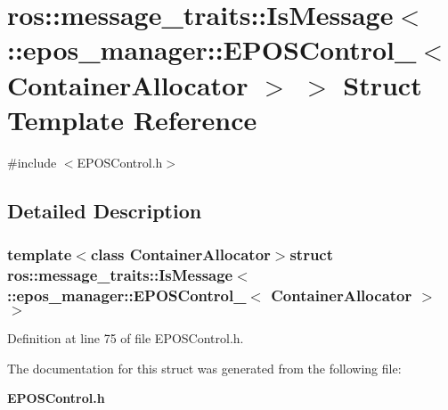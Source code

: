 \section{ros\-:\-:message\-\_\-traits\-:\-:\-Is\-Message$<$ \-:\-:epos\-\_\-manager\-:\-:\-E\-P\-O\-S\-Control\-\_\-$<$ \-Container\-Allocator $>$ $>$ \-Struct \-Template \-Reference}
\label{structros_1_1message__traits_1_1IsMessage_3_01_1_1epos__manager_1_1EPOSControl___3_01ContainerAllocator_01_4_01_4}


{\ttfamily \#include $<$\-E\-P\-O\-S\-Control.\-h$>$}



\subsection{\-Detailed \-Description}
\subsubsection*{template$<$class Container\-Allocator$>$struct ros\-::message\-\_\-traits\-::\-Is\-Message$<$ \-::epos\-\_\-manager\-::\-E\-P\-O\-S\-Control\-\_\-$<$ Container\-Allocator $>$ $>$}



\-Definition at line 75 of file \-E\-P\-O\-S\-Control.\-h.



\-The documentation for this struct was generated from the following file\-:\begin{DoxyCompactItemize}
\item 
{\bf \-E\-P\-O\-S\-Control.\-h}\end{DoxyCompactItemize}
